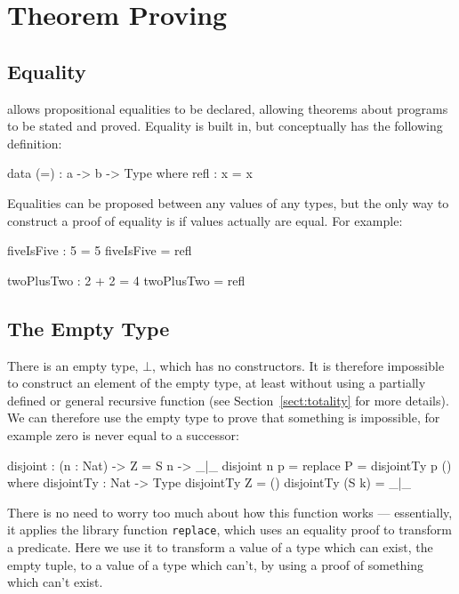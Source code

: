 \section{Theorem Proving}

\subsection{Equality}

\Idris{} allows propositional equalities to be declared, allowing theorems about
programs to be stated and proved.
Equality is built in, but conceptually has the following definition:

\begin{code}
data (=) : a -> b -> Type where
   refl : x = x
\end{code}

\noindent
Equalities can be proposed between any values of any types, but the only way to construct a proof of equality is if values actually are equal.
For example:

\begin{code}
fiveIsFive : 5 = 5
fiveIsFive = refl

twoPlusTwo : 2 + 2 = 4
twoPlusTwo = refl
\end{code}

\subsection{The Empty Type}

\label{sect:empty}

There is an empty type, $\bot$, which has no constructors.
It is therefore impossible to construct an element of the empty type, at least without using a partially defined or general recursive function (see Section~\ref{sect:totality} for more details).
We can therefore use the empty type to prove that something is impossible, for example zero is never equal to a successor:

\begin{code}
disjoint : (n : Nat) -> Z = S n -> _|_
disjoint n p = replace {P = disjointTy} p ()
  where
    disjointTy : Nat -> Type
    disjointTy Z = ()
    disjointTy (S k) = _|_
\end{code}

\noindent
There is no need to worry too much about how this function works --- essentially, it applies the library function \texttt{replace}, which uses an equality proof to  transform a predicate.
Here we use it to transform a value of a type which can exist, the empty tuple, to a value of a type which can't, by using a proof of something which can't exist.

